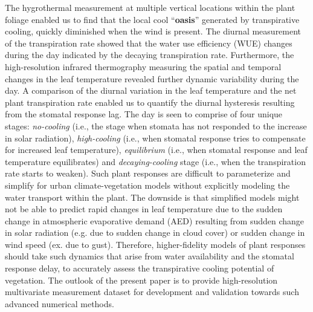 The hygrothermal measurement at multiple vertical locations within the plant foliage enabled us to find that the local cool ``\textbf{oasis}'' generated by transpirative cooling, quickly diminished when the wind is present. The diurnal measurement of the transpiration rate showed that the water use efficiency (WUE) changes during the day indicated by the decaying transpiration rate. Furthermore, the high-resolution infrared thermography measuring the spatial and temporal changes in the leaf temperature revealed further dynamic variability during the day. A comparison of the diurnal variation in the leaf temperature and the net plant transpiration rate enabled us to quantify the diurnal hysteresis resulting from the stomatal response lag. The day is seen to comprise of four unique stages: \textit{no-cooling} (i.e., the stage when stomata has not responded to the increase in solar radiation), \textit{high-cooling} (i.e., when stomatal response tries to compensate for increased leaf temperature), \textit{equilibrium} (i.e., when stomatal response and leaf temperature equilibrates) and \textit{decaying-cooling} stage (i.e., when the transpiration rate starts to weaken). Such plant responses are difficult to parameterize and simplify for urban climate-vegetation models without explicitly modeling the water transport within the plant. The downside is that simplified models might not be able to predict rapid changes in leaf temperature due to the sudden change in atmospheric evaporative demand (AED) resulting from sudden change in solar radiation (e.g. due to sudden change in cloud cover) or sudden change in wind speed (ex. due to gust). Therefore, higher-fidelity models of plant responses should take such dynamics that arise from water availability and the stomatal response delay, to accurately assess the transpirative cooling potential of vegetation. The outlook of the present paper is to provide high-resolution multivariate measurement dataset for development and validation towards such advanced numerical methods. 



